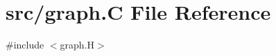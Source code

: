 \hypertarget{graph_8_c}{}\section{src/graph.C File Reference}
\label{graph_8_c}
{\ttfamily \#include $<$graph.\+H$>$}\newline
